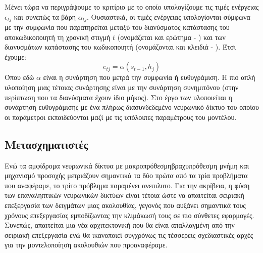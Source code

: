 Μένει τώρα να περιγράψουμε το κριτίριο με το οποίο υπολογίζουμε τις τιμές ενέργειας $\epsilon_{tj}$ και συνεπώς τα βάρη $\alpha_{tj}$. Ουσιαστικά, οι τιμές ενέργειας υπολογίονται σύμφωνα με την συμφωνία που παρατηρείται μεταξύ του διανύσματος κατάστασης του αποκωδικοποιητή τη χρονική στιγμή $t$ (ονομάζεται και ερώτημα - ) και των διανυσμάτων κατάστασης του κωδικοποιητή (ονομάζονται και κλειδιά - ). Έτσι έχουμε:
\[
  e_{tj} = \alpha(s_{t-1}, h_j)
\] Όπου εδώ $\alpha$ είναι η συνάρτηση που μετρά την συμφωνία ή ευθυγράμιση. Η πιο απλή υλοποίηση μιας τέτοιας συνάρτησης είναι με την συνάρτηση συνημιτόνου (στην περίπτωση που τα διανύσματα έχουν ίδιο μήκος). Στο έργο των  \cite{bahdanau2014neural_machine_translation_attention_begins} υλοποιείται η συνάρτηση ευθυγράμισης με ένα πλήρως διασυνδεδεμένο νευρωνικό δίκτυο του οποίου οι παράμετροι εκπαιδεύονται μαζί με τις υπόλοιπες παραμέτρους του μοντέλου.

\subsection{Μετασχηματιστές}
Ενώ τα αμφίδρομα νευρωνικά δίκτυα με μακροπρόθεσμη\textendash βραχυπρόθεσμη μνήμη και μηχανισμό προσοχής μετριάζουν σημαντικά τα δύο πρώτα από τα τρία προβλήματα που αναφέραμε, το τρίτο πρόβλημα παραμένει ανεπιλυτο. Για την ακρίβεια, η φύση των επαναληπτικών νευρωνικών δικτύων είναι τέτοια ώστε να απαιτείται σειριακή επεξεργασία των δειγμάτων μιας ακολουθίας, γεγονός που αυξάνει σημαντικά τους χρόνους επεξεργασίας εμποδίζωντας την κλιμάκωσή τους σε πιο σύνθετες εφαρμογές. Συνεπώς, απαιτείται μια νέα αρχιτεκτονική που θα είναι απαλλαγμένη από την σειριακή επεξεργασία ενώ θα ικανοποιεί συγχρόνως τις τέσσερεις σχεδιαστικές αρχές για την μοντελοποίηση ακολουθιών που προαναφέραμε.\par

